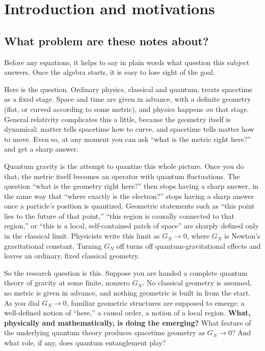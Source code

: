 \chapter{Introduction and motivations}

\section{What problem are these notes about?}

Before any equations, it helps to say in plain words what question this subject answers. Once the algebra
starts, it is easy to lose sight of the goal.

Here is the question. Ordinary physics, classical and quantum, treats spacetime as a fixed stage. Space and
time are given in advance, with a definite geometry (flat, or curved according to some metric), and physics
happens \emph{on} that stage. General relativity complicates this a little, because the geometry itself is
dynamical: matter tells spacetime how to curve, and spacetime tells matter how to move. Even so, at any moment
you can ask ``what is the metric right here?'' and get a sharp answer.

Quantum gravity is the attempt to quantize this whole picture. Once you do that, the metric itself becomes an
operator with quantum fluctuations. The question ``what is the geometry right here?'' then stops having a
sharp answer, in the same way that ``where exactly is the electron?'' stops having a sharp answer once a
particle's position is quantized. Geometric statements such as ``this point lies to the future of that
point,'' ``this region is causally connected to that region,'' or ``this is a local, self-contained patch of
space'' are sharply defined only in the classical limit. Physicists write this limit as $G_N\to0$, where
$G_N$ is Newton's gravitational constant. Turning $G_N$ off turns off quantum-gravitational effects and leaves
an ordinary, fixed classical geometry.

So the research question is this. Suppose you are handed a complete quantum theory of gravity at some finite,
nonzero $G_N$. No classical geometry is assumed, no metric is given in advance, and nothing geometric is built
in from the start. As you dial $G_N\to0$, familiar geometric structures are supposed to emerge: a
well-defined notion of ``here,'' a causal order, a notion of a local region. \textbf{What, physically and
mathematically, is doing the emerging?} What feature of the underlying quantum theory produces spacetime
geometry as $G_N\to0$? And what role, if any, does quantum entanglement play?

